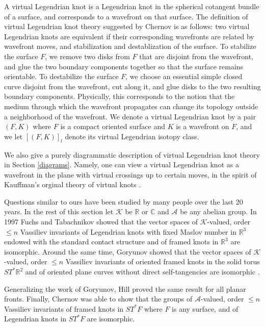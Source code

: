 A virtual Legendrian knot is a Legendrian knot in the spherical cotangent bundle of a surface, and corresponds to a wavefront on that surface.  The definition of virtual Legendrian knot theory suggested by Chernov is as follows: two virtual Legendrian knots are equivalent if their corresponding wavefronts are related by wavefront moves, and stabilization and destablization of the surface. To stabilize the surface $F$, we remove two disks from $F$ that are disjoint from the wavefront, and glue the two boundary components together so that the surface remains orientable.  To destabilize the surface $F$, we choose an essential simple closed curve disjoint from the wavefront, cut along it, and glue disks to the two resulting boundary components.  Physically, this corresponds to the notion that the medium through which the wavefront propagates can change its topology outside a neighborhood of the wavefront.  We denote a virtual Legendrian knot by a pair $(F,K)$ where $F$ is a compact oriented surface and $K$ is a wavefront on $F$, and we let $[(F,K)]_l$ denote its virtual Legendrian isotopy class.


We also give a purely diagrammatic description of virtual Legendrian knot theory in Section \ref{diagrams}.  Namely, one can view a virtual Legendrian knot as a wavefront in the plane with virtual crossings up to certain moves, in the spirit of Kauffman's orginal theory of virtual knots \cite{Kauffman}.  







Questions similar to ours have been studied by many people over the last 20 years.  In the rest of this section let $\mathcal{K}$ be $\mathbb{R}$ or $\mathbb{C}$ and $\mathcal{A}$ be any abelian group.  In 1997 Fuchs and Tabachnikov \cite{ft} showed that the vector spaces of $\mathcal{K}$-valued, order $\leq n$ Vassiliev invariants of Legendrian knots with fixed Maslov number in $\mathbb{R}^3$ endowed with the standard contact structure and of framed knots in $\mathbb{R}^3$ are isomorphic.  Around the same time, Goryunov showed that the vector spaces of $\mathcal{K}$-valued, order $\leq n$ Vassiliev invariants of oriented framed knots in the solid torus $ST^*\mathbb{R}^2$ and of oriented plane curves without direct self-tangencies are isomorphic \cite{Goryunov}.


Generalizing the work of Goryunov, Hill \cite{Hill} proved the same result for all planar fronts.  Finally, Chernov \cite{Chernov} was able to show that the groups of $\mathcal{A}$-valued, order $\leq n$ Vassiliev invariants of framed knots in $ST^*F$ where $F$ is any surface, and of Legendrian knots in $ST^*F$ are isomorphic.  


